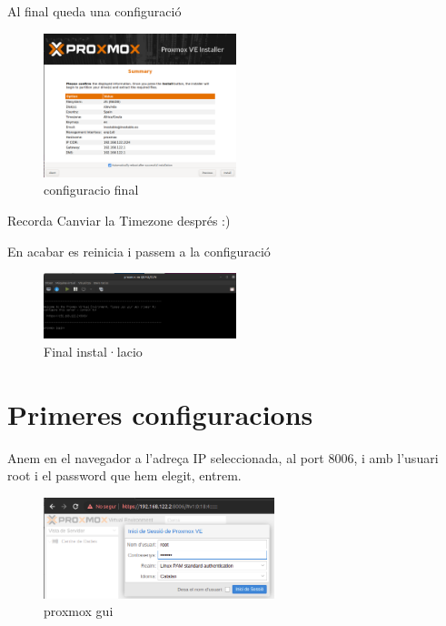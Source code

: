 \documentclass[
  10pt,
]{krantz}
\begin{document}
Al final queda una configuració

\begin{figure}
\centering
\includegraphics[width=0.5\textwidth,height=\textheight]{imatges/proxmox/proxmox_inst12.png}
\caption{configuracio final}
\end{figure}

\begin{rmdnote}{Recorda}
Canviar la Timezone després :)

\end{rmdnote}

En acabar es reinicia i passem a la configuració

\begin{figure}
\centering
\includegraphics[width=0.5\textwidth,height=\textheight]{imatges/proxmox/proxmox_inst14.png}
\caption{Final instal·lacio}
\end{figure}

\hypertarget{primeres-configuracions}{%
\section{Primeres configuracions}\label{primeres-configuracions}}

Anem en el navegador a l'adreça IP seleccionada, al port 8006, i amb l'usuari root i el password que hem elegit, entrem.

\begin{figure}
\centering
\includegraphics[width=0.6\textwidth,height=\textheight]{imatges/proxmox/proxmox_gui1.png}
\caption{proxmox gui}
\end{figure}
\end{document}
